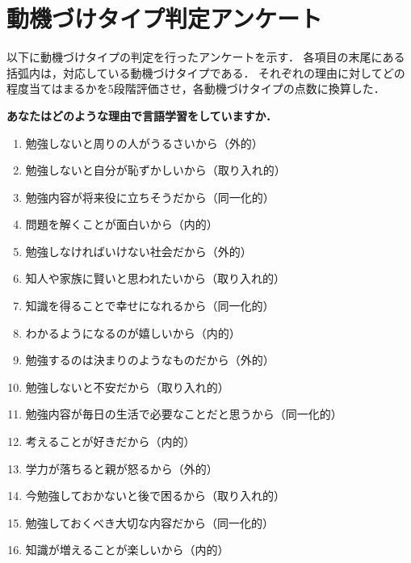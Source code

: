 \chapter{動機づけタイプ判定アンケート}
以下に動機づけタイプの判定を行ったアンケートを示す．
各項目の末尾にある括弧内は，対応している動機づけタイプである．
それぞれの理由に対してどの程度当てはまるかを5段階評価させ，各動機づけタイプの点数に換算した．

\vspace{0.2in}

\textbf{あなたはどのような理由で言語学習をしていますか．}

\begin{enumerate}
	\item 勉強しないと周りの人がうるさいから（外的）
	\item 勉強しないと自分が恥ずかしいから（取り入れ的）
	\item 勉強内容が将来役に立ちそうだから（同一化的）
	\item 問題を解くことが面白いから（内的）
	\item 勉強しなければいけない社会だから（外的）
	\item 知人や家族に賢いと思われたいから（取り入れ的）
	\item 知識を得ることで幸せになれるから（同一化的）
	\item わかるようになるのが嬉しいから（内的）
	\item 勉強するのは決まりのようなものだから（外的）
	\item 勉強しないと不安だから（取り入れ的）
	\item 勉強内容が毎日の生活で必要なことだと思うから（同一化的）
	\item 考えることが好きだから（内的）
	\item 学力が落ちると親が怒るから（外的）
	\item 今勉強しておかないと後で困るから（取り入れ的）
	\item 勉強しておくべき大切な内容だから（同一化的）
	\item 知識が増えることが楽しいから（内的）
\end{enumerate}